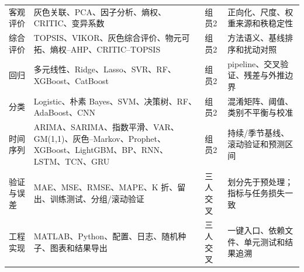 \begin{longtable}{p{2.1cm}p{5.0cm}p{2.0cm}p{5.5cm}}
客观评价 & 灰色关联、PCA、因子分析、熵权、CRITIC、变异系数 & 组员2 & 正向化、尺度、权重来源和秩稳定性\\
综合评价 & TOPSIS、VIKOR、灰色综合评价、物元可拓、熵权--AHP、CRITIC--TOPSIS & 组员2 & 方法语义、基线排序和扰动对照\\
回归 & 多元线性、Ridge、Lasso、SVR、RF、XGBoost、CatBoost & 组员2 & pipeline、交叉验证、残差与外推边界\\
分类 & Logistic、朴素 Bayes、SVM、决策树、RF、AdaBoost、CNN & 组员2 & 混淆矩阵、阈值、类别不平衡与校准\\
时间序列 & ARIMA、SARIMA、指数平滑、VAR、GM(1,1)、灰色--Markov、Prophet、XGBoost、LightGBM、BP、RNN、LSTM、TCN、GRU & 组员2 & 持续/季节基线、滚动验证和预测区间\\
验证与误差 & MAE、MSE、RMSE、MAPE、K 折、留出、训练测试、分组/滚动验证 & 三人交叉 & 划分先于预处理；指标与任务损失一致\\
工程实现 & MATLAB、Python、配置、日志、随机种子、图表和结果导出 & 三人交叉 & 一键入口、依赖文件、单元测试和结果追溯\\
\bottomrule
\end{longtable}

